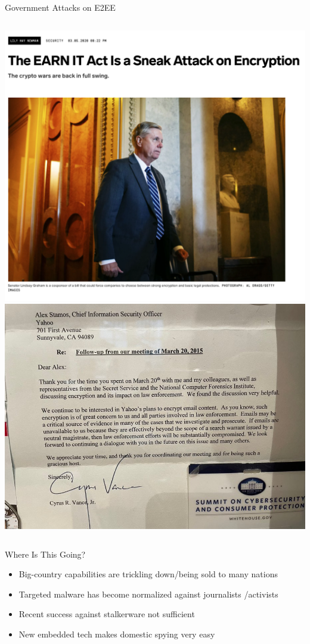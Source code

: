 \documentclass[nobackground,dvipsnames,table,aspectratio=169]{beamer}
\begin{document}
\begin{frame}{Government Attacks on E2EE}
    \begin{columns}
            \includegraphics[width=\textwidth]{earn-it-wired}
            \includegraphics[width=\textwidth]{encryption-meeting-follow-up}
    \end{columns}
\end{frame}

\begin{frame}{Where Is This Going?}
    \large
    \begin{itemize}
        \item Big-country capabilities are trickling down/being sold to many nations
        \item Targeted malware has become normalized  against journalists /activists
        \item Recent success against stalkerware not sufficient 
        \item New embedded tech makes domestic spying very easy
    \end{itemize}
\end{frame}
\end{document}
